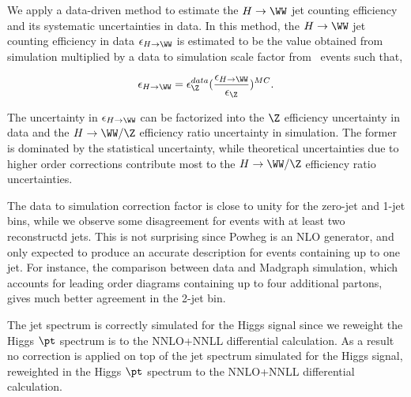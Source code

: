 We apply a data-driven method to estimate the $H \to \WW$ jet counting 
efficiency and its systematic uncertainties in data. 
In this method, the $H \to \WW$ jet counting efficiency in data $\epsilon_{H \to \WW}$
is estimated to be the value obtained from simulation multiplied by a data to simulation
scale factor from \dyll~events such that,

$$\epsilon_{H \to \WW} = \epsilon_{\Z}^{data} (\frac{\epsilon_{H \to \WW}}{\epsilon_{\Z}})^{MC}.$$

The uncertainty in $\epsilon_{H \to \WW}$ can be factorized into the 
$\Z$ efficiency uncertainty in data and the $H \to \WW/\Z$ efficiency ratio 
uncertainty in simulation. 
The former is dominated by the statistical uncertainty, while 
theoretical uncertainties due to higher order corrections contribute most 
to the $H \to \WW/\Z$ efficiency ratio uncertainties. 

The data to simulation correction factor is close to unity for the zero-jet and 1-jet bins, 
while we observe some disagreement for events with at least two reconstructd jets. 
This is not surprising since Powheg is an NLO generator, and 
only expected to produce an accurate description for events 
containing up to one jet. For instance, the comparison between data and Madgraph 
simulation, which accounts for leading order diagrams containing up to four additional
partons, gives much better agreement in the 2-jet bin. 

The jet spectrum is correctly simulated for the Higgs signal since we
reweight the Higgs $\pt$ spectrum is to the NNLO+NNLL differential calculation. 
As a result no correction is applied on top of the jet spectrum simulated for the Higgs signal, 
reweighted in the Higgs $\pt$ spectrum to the NNLO+NNLL differential calculation.
